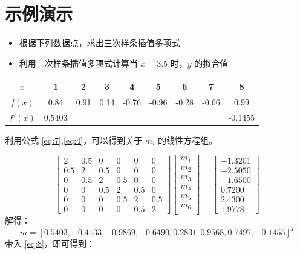 \documentclass{ctexart}
\numberwithin{equation}{section}
\begin{document}
\section{示例演示}
\begin{itemize}
    \item 根据下列数据点，求出三次样条插值多项式
    \item 利用三次样条插值多项式计算当 $x = 3.5$ 时，$y$ 的拟合值
\end{itemize}
\begin{table}[htp]
    \begin{center}
    \begin{tabular}{ccccccccc}
    \toprule
    $x$     & 1      & 2    & 3    & 4     & 5     & 6     & 7     & 8       \\
    \midrule
    $f(x)$  & 0.84   & 0.91 & 0.14 & -0.76 & -0.96 & -0.28 & -0.66 & 0.99    \\
    $f'(x)$ & $0.5403$ &      &      &       &       &       &       & -0.1455  \\
    \bottomrule
    \end{tabular}
    \end{center}
    \end{table}
    利用公式 \eqref{eq:7},\eqref{eq:4}，可以得到关于 $m_i$ 的线性方程组。

    \begin{equation}
        \begin{bmatrix}
            2 & 0.5 & 0 & 0 & 0 & 0 \\
            0.5 & 2 & 0.5 & 0 & 0 & 0 \\
            0 & 0.5 & 2 & 0.5 & 0 & 0 \\
            0 & 0 & 0.5 & 2 & 0.5 & 0 \\
            0 & 0 & 0 & 0.5 & 2 & 0.5 \\
            0 & 0 & 0 & 0 & 0.5 & 2
            \end{bmatrix}
            \begin{bmatrix}
                    m_1\\
                    m_2\\
                    m_3\\
                    m_4\\
                    m_5\\
                    m_6\\
                \end{bmatrix}=
                \begin{bmatrix}
                    -1.3201 \\
                    -2.5050 \\
                    -1.6500 \\
                    0.7200 \\
                    2.4300 \\
                    1.9778
                    \end{bmatrix}
    \end{equation}
    解得：
    \[m = [0.5403,-0.4133 ,-0.9869,-0.6490,0.2831,0.9568,0.7497,-0.1455]^T\]
    带入 \eqref{eq:8}，即可得到：
\end{document}

